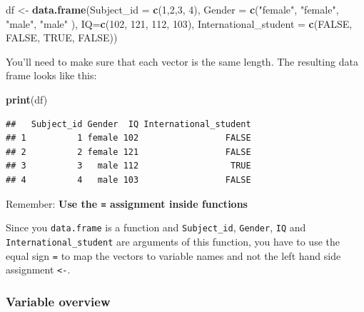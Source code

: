 \documentclass[
]{scrartcl}
\makeatletter
\newenvironment{Shaded}{\begin{snugshade}}{\end{snugshade}}
\newcommand{\AttributeTok}[1]{\textcolor[rgb]{0.13,0.29,0.53}{#1}}
\newcommand{\ConstantTok}[1]{\textcolor[rgb]{0.56,0.35,0.01}{#1}}
\newcommand{\DecValTok}[1]{\textcolor[rgb]{0.00,0.00,0.81}{#1}}
\newcommand{\FunctionTok}[1]{\textcolor[rgb]{0.13,0.29,0.53}{\textbf{#1}}}
\newcommand{\NormalTok}[1]{#1}
\newcommand{\OtherTok}[1]{\textcolor[rgb]{0.56,0.35,0.01}{#1}}
\newcommand{\StringTok}[1]{\textcolor[rgb]{0.31,0.60,0.02}{#1}}
\newenvironment{kframe}{%
\medskip{}
\setlength{\fboxsep}{.8em}
 \def\at@end@of@kframe{}%
 \ifinner\ifhmode%
  \def\at@end@of@kframe{\end{minipage}}%
  \begin{minipage}{\columnwidth}%
 \fi\fi%
 \def\FrameCommand##1{\hskip\@totalleftmargin \hskip-\fboxsep
 \colorbox{shadecolor}{##1}\hskip-\fboxsep
     \hskip-\linewidth \hskip-\@totalleftmargin \hskip\columnwidth}%
 \MakeFramed {\advance\hsize-\width
   \@totalleftmargin\z@ \linewidth\hsize
   \@setminipage}}%
 {\par\unskip\endMakeFramed%
 \at@end@of@kframe}
\newenvironment{rmdblock}[1]
  {
  \begin{itemize}
  \renewcommand{\labelitemi}{
    \raisebox{-.7\height}[0pt][0pt]{
      {\setkeys{Gin}{width=3em,keepaspectratio}\texttt{[image: images/\#1]}}
    }
  }
  \setlength{\fboxsep}{1em}
  \begin{kframe}
  \item
  }
  {
  \end{kframe}
  \end{itemize}
  }
\newenvironment{important}
    {\begin{rmdblock}{hint}}
    {\end{rmdblock}}
\makeatother
\begin{document}
\begin{Shaded}
\begin{Highlighting}[]
\NormalTok{df }\OtherTok{\textless{}{-}} \FunctionTok{data.frame}\NormalTok{(}\AttributeTok{Subject\_id =} \FunctionTok{c}\NormalTok{(}\DecValTok{1}\NormalTok{,}\DecValTok{2}\NormalTok{,}\DecValTok{3}\NormalTok{, }\DecValTok{4}\NormalTok{),}
                 \AttributeTok{Gender =} \FunctionTok{c}\NormalTok{(}\StringTok{"female"}\NormalTok{, }\StringTok{"female"}\NormalTok{, }\StringTok{"male"}\NormalTok{, }\StringTok{"male"}\NormalTok{ ),}
                 \AttributeTok{IQ=}\FunctionTok{c}\NormalTok{(}\DecValTok{102}\NormalTok{, }\DecValTok{121}\NormalTok{, }\DecValTok{112}\NormalTok{, }\DecValTok{103}\NormalTok{),}
                 \AttributeTok{International\_student =} \FunctionTok{c}\NormalTok{(}\ConstantTok{FALSE}\NormalTok{, }\ConstantTok{FALSE}\NormalTok{, }\ConstantTok{TRUE}\NormalTok{, }\ConstantTok{FALSE}\NormalTok{))}
\end{Highlighting}
\end{Shaded}

You'll need to make sure that each vector is the same length. The resulting data frame looks like this:

\begin{Shaded}
\begin{Highlighting}[]
\FunctionTok{print}\NormalTok{(df)}
\end{Highlighting}
\end{Shaded}

\begin{verbatim}
##   Subject_id Gender  IQ International_student
## 1          1 female 102                 FALSE
## 2          2 female 121                 FALSE
## 3          3   male 112                  TRUE
## 4          4   male 103                 FALSE
\end{verbatim}

\begin{important}
Remember: \textbf{Use the \texttt{=} assignment inside functions}

Since you \texttt{data.frame} is a function and \texttt{Subject\_id},
\texttt{Gender}, \texttt{IQ} and \texttt{International\_student} are
arguments of this function, you have to use the equal sign \texttt{=} to
map the vectors to variable names and not the left hand side assignment
\texttt{\textless{}-}.
\end{important}

\hypertarget{variable-overview}{%
\subsubsection*{Variable overview}\label{variable-overview}}
\end{document}

